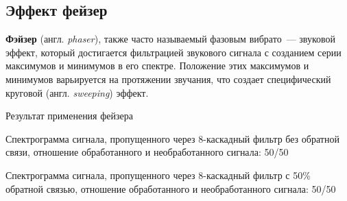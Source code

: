 \documentclass{beamer}
\begin{document}
\subsection{Эффект фейзер}
\begin{frame}
  \textbf{Фэйзер} (англ. \textit{phaser}), также часто называемый фазовым вибрато~--- звуковой эффект, который достигается фильтрацией звукового сигнала с созданием серии максимумов и минимумов в его спектре. Положение этих максимумов и минимумов варьируется на протяжении звучания, что создает специфический круговой (англ. \textit{sweeping}) эффект.

  \begin{block}{Результат применения фейзера}
  \end{block}
\end{frame}

\begin{frame}
  \begin{block}{Спектрограмма сигнала, пропущенного через 8-каскадный фильтр без обратной связи, отношение обработанного и необработанного сигнала: 50/50}
  \end{block}
\end{frame}

\begin{frame}
  \begin{block}{Спектрограмма сигнала, пропущенного через 8-каскадный фильтр с 50\% обратной связью, отношение обработанного и необработанного сигнала: 50/50}
  \end{block}
\end{frame}
\end{document}
